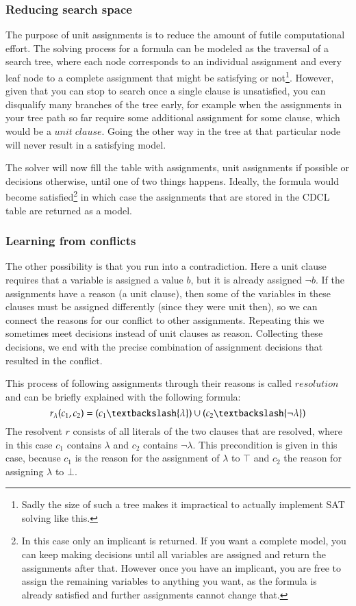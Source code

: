 \subsubsection{Reducing search space}
The purpose of unit assignments is to reduce the amount of futile computational effort. The solving process for a formula can be modeled as the traversal of a search tree, where each node corresponds to an individual assignment and every leaf node to a complete assignment that might be satisfying or not\footnote
{
	Sadly the size of such a tree makes it impractical to actually implement SAT solving like this.
}. However, given that you can stop to search once a single clause is unsatisfied, you can disqualify many branches of the tree early, for example when the assignments in your tree path so far require some additional assignment for some clause, which would be a $unit\; clause$. Going the other way in the tree at that particular node will never result in a satisfying model.

The solver will now fill the table with assignments, unit assignments if possible or decisions otherwise, until one of two things happens. Ideally, the formula would become satisfied\footnote{
	In this case only an implicant is returned. If you want a complete model, you can keep making decisions until all variables are assigned and return the assignments after that. However once you have an implicant, you are free to assign the remaining variables to anything you want, as the formula is already satisfied and further assignments cannot change that.}
 in which case the assignments that are stored in the CDCL table are returned as a model.


\subsubsection{Learning from conflicts}
The other possibility is that you run into a contradiction. Here a unit clause requires that a variable is assigned a value $b$, but it is already assigned $\neg b$. If the assignments have a reason (a unit clause), then some of the variables in these clauses must be assigned differently (since they were unit then), so we can connect the reasons for our conflict to other assignments. Repeating this we sometimes meet decisions instead of unit clauses as reason. Collecting these decisions, we end with the precise combination of assignment decisions that resulted in the conflict. 


This process of following assignments through their reasons is called $resolution$ and can be briefly explained with the following formula:
$$
r_\lambda(c_1,c_2) = (c_1 \textbackslash \{\lambda\}) \cup (c_2 \textbackslash \{\neg \lambda\})
$$
The resolvent $r$ consists of all literals of the two clauses that are resolved, where in this case $c_1$ contains $\lambda$ and $c_2$ contains $\neg \lambda$. This precondition is given in this case, because $c_1$ is the reason for the assignment of $\lambda$ to $\top$ and $c_2$ the reason for assigning $\lambda$ to $\bot$. 

